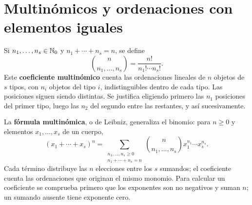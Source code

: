 \section{Multinómicos y ordenaciones con elementos iguales}
\label{md:multinomial}

Si $n_1,\ldots,n_s\in\mathbb{N}_0$ y $n_1+\cdots+n_s=n$, se define
\[
 \binom{n}{n_1,\ldots,n_s}=\frac{n!}{n_1!\cdots n_s!}.
\]
Este \textbf{coeficiente multinómico} cuenta las ordenaciones lineales
de $n$ objetos de $s$ tipos, con $n_i$ objetos del tipo $i$,
indistinguibles dentro de cada tipo. Las posiciones siguen siendo distintas.
Se justifica eligiendo primero las $n_1$ posiciones del primer tipo,
luego las $n_2$ del segundo entre las restantes, y así sucesivamente.

La \textbf{fórmula multinómica}, o de Leibniz, generaliza el binomio:
para $n\ge0$ y elementos $x_1,\ldots,x_s$ de un cuerpo,
\[
 \boxed{(x_1+\cdots+x_s)^n=
 \sum_{\substack{n_1,\ldots,n_s\ge0\\n_1+\cdots+n_s=n}}
 \binom{n}{n_1,\ldots,n_s}x_1^{n_1}\cdots x_s^{n_s}.}
\]
Cada término distribuye las $n$ elecciones entre los $s$ sumandos;
el coeficiente cuenta las ordenaciones que originan el mismo monomio.
Para calcular un coeficiente se comprueba primero que los exponentes
son no negativos y suman $n$; un sumando ausente tiene exponente cero.
